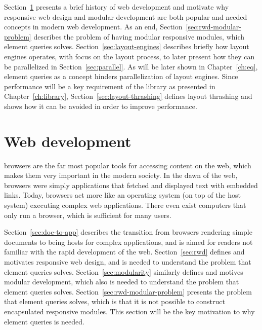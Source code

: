 \documentclass[a4paper,11pt]{kth-mag}
\begin{document}
    Section~\ref{sec:web-dev} presents a brief history of \gls{web} development and motivate why \gls{responsive} \gls{web} design and modular development are both popular and needed concepts in modern \gls{web} development.
    As an end, Section~\ref{sec:rwd-modular-problem} describes the problem of having modular \gls{responsive} modules, which element queries solves.    
    Section~\ref{sec:layout-engines} describes briefly how \glspl{layout engine} operates, with focus on the layout process, to later present how they can be parallelized in Section~\ref{sec:parallel}.
    As will be later shown in Chapter~\ref{ch:eq}, element queries as a concept hinders parallelization of \glspl{layout engine}.
    Since performance will be a key requirement of the library as presented in Chapter~\ref{ch:library}, Section~\ref{sec:layout-thrashing} defines \gls{layout thrashing} and shows how it can be avoided in order to improve performance.

    \section{Web development}\label{sec:web-dev}
      \Glspl{browser} are the far most popular tools for accessing content on the \gls{web}, which makes them very important in the modern society.
      In the dawn of the \gls{web}, \glspl{browser} were simply applications that fetched and displayed text with embedded links.
      Today, \glspl{browser} act more like an operating system (on top of the host system) executing complex \gls{web} applications.
      There even exist computers that only run a \gls{browser}, which is sufficient for many users.
      
      Section~\ref{sec:doc-to-app} describes the transition from \glspl{browser} rendering simple \glspl{document} to being hosts for complex applications, and is aimed for readers not familiar with the rapid development of the \gls{web}.
      Section~\ref{sec:rwd} defines and motivates \gls{responsive} \gls{web} design, and is needed to understand the problem that element queries solves.
      Section~\ref{sec:modularity} similarly defines and motives modular development, which also is needed to understand the problem that element queries solves.
      Section~\ref{sec:rwd-modular-problem} presents the problem that element queries solves, which is that it is not possible to construct \gls{encapsulated} \gls{responsive} modules.
      This section will be the key motivation to why element queries is needed.
\end{document}
